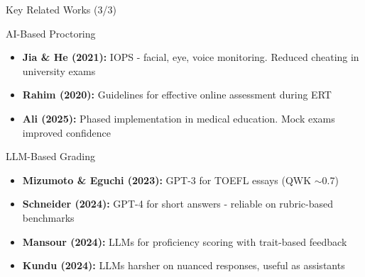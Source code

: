 \begin{frame}{Key Related Works (3/3)}
    \begin{block}{AI-Based Proctoring}
        \begin{itemize}
            \item \textbf{Jia \& He (2021):} IOPS - facial, eye, voice monitoring. Reduced cheating in university exams
            \item \textbf{Rahim (2020):} Guidelines for effective online assessment during ERT
            \item \textbf{Ali (2025):} Phased implementation in medical education. Mock exams improved confidence
        \end{itemize}
    \end{block}
    
    \begin{block}{LLM-Based Grading}
        \begin{itemize}
            \item \textbf{Mizumoto \& Eguchi (2023):} GPT-3 for TOEFL essays (QWK $\sim$0.7)
            \item \textbf{Schneider (2024):} GPT-4 for short answers - reliable on rubric-based benchmarks
            \item \textbf{Mansour (2024):} LLMs for proficiency scoring with trait-based feedback
            \item \textbf{Kundu (2024):} LLMs harsher on nuanced responses, useful as assistants
        \end{itemize}
    \end{block}
\end{frame}

